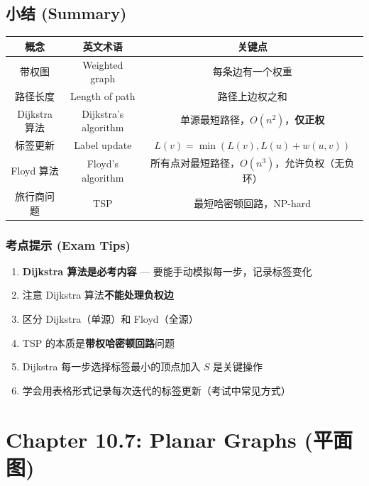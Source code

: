 \documentclass[10pt,a4paper,openany]{ctexbook}
\theoremstyle{definition}
\theoremstyle{remark}
\begin{document}
\vspace{-2pt}

\subsection{小结 (Summary)}

\begin{center}
\begin{tabular}{ccc}
\hline
概念 & 英文术语 & 关键点 \\ \hline
带权图 & Weighted graph & 每条边有一个权重 \\
路径长度 & Length of path & 路径上边权之和 \\
Dijkstra 算法 & Dijkstra's algorithm & 单源最短路径，$O(n^2)$，\textbf{仅正权} \\
标签更新 & Label update & $L(v) = \min(L(v), L(u) + w(u,v))$ \\
Floyd 算法 & Floyd's algorithm & 所有点对最短路径，$O(n^3)$，允许负权（无负环） \\
旅行商问题 & TSP & 最短哈密顿回路，NP-hard \\
\hline
\end{tabular}

\end{center}

\subsubsection{考点提示 (Exam Tips)}

\begin{enumerate}
\item \textbf{Dijkstra 算法是必考内容} — 要能手动模拟每一步，记录标签变化
\item 注意 Dijkstra 算法\textbf{不能处理负权边}
\item 区分 Dijkstra（单源）和 Floyd（全源）
\item TSP 的本质是\textbf{带权哈密顿回路}问题
\item Dijkstra 每一步选择标签最小的顶点加入 $S$ 是关键操作
\item 学会用表格形式记录每次迭代的标签更新（考试中常见方式）

\end{enumerate}


\section{Chapter 10.7: Planar Graphs (平面图)}

\vspace{-2pt}
\end{document}
